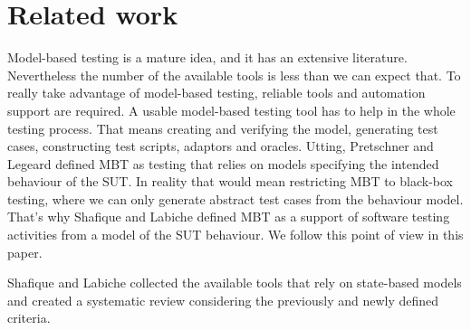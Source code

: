 \chapter{Related work}
\label{cha:relatedwork}

Model-based testing is a mature idea, and it has an extensive literature. Nevertheless the number of the available tools is less than we can expect that. To really take advantage of model-based testing, reliable tools and automation support are required. A usable model-based testing tool has to help in the whole testing process. That means creating and verifying the model, generating test cases, constructing test scripts, adaptors and oracles. Utting, Pretschner and Legeard \cite{taxonomy} defined MBT as testing that relies on models specifying the intended behaviour of the SUT. In reality that would mean restricting MBT to black-box testing, where we can only generate abstract test cases from the behaviour model. That's why Shafique and Labiche defined MBT as a support of software testing activities from a model of the SUT behaviour. We follow this point of view in this paper.

Shafique and Labiche \cite{toolsreview} collected the available tools that rely on state-based models and created a systematic review considering the previously and newly defined criteria.

